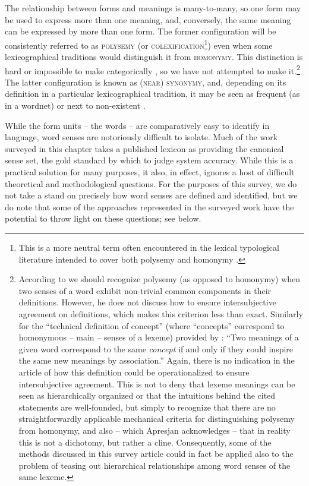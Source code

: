 \documentclass[output=paper]{langsci/langscibook}
\begin{document}
The relationship between forms and meanings is many-to-many, so
one form may be used to express more than one meaning, and, conversely, the same meaning can be expressed by more than one form. The
former configuration will be consistently referred to as
\textsc{polysemy} (or \textsc{colexification}\footnote{This is a more neutral term often encountered in the lexical typological literature intended to cover both polysemy and homonymy \citep[e.g.,][]{francois2008semantic,ostling-2016}.}) even when some lexicographical traditions
would distinguish it from \textsc{homonymy}. This distinction is hard
or impossible to make categorically
\citep{apresjan-1974,murphy-2003,riemer-2010,wishart-2018}, so we have not attempted to make it.\footnote{According to
  \citet{apresjan-1974} we should recognize polysemy (as opposed to
  homonymy) when two senses of a word exhibit non-trivial common
  components in their definitions. However, he does not discuss how to ensure
  intersubjective agreement on definitions, which makes this
  criterion less than exact. Similarly for the ``technical definition
  of concept'' (where ``concepts'' correspond to homonymous -- main --
  senses of a lexeme) provided by \citet[235; emphasis in the
    original]{cooper05}: ``Two meanings of a given word correspond to
  the same \emph{concept} if and only if they could inspire the same
  new meanings by association.'' Again, there is no indication in the
  article of how this definition could be operationalized to ensure
  intersubjective agreement. This is not to deny that lexeme meanings
  can be seen as hierarchically organized or that the intuitions
  behind the cited statements are well-founded, but simply to
  recognize that there are no straightforwardly applicable mechanical
  criteria for distinguishing polysemy from homonymy, and also --
  which Apresjan acknowledges -- that in reality this is not a
  dichotomy, but rather a cline. Consequently, some of the methods
  discussed in this survey article could in fact be applied also to
  the problem of teasing out hierarchical relationships among word
  senses of the same lexeme.}  The latter configuration is known as
\textsc{(near) synonymy}, and, depending on its definition in a
particular lexicographical tradition, it may be seen as frequent (as
in a wordnet) or next to non-existent
\citep{cruse-1986,ci-2008,murphy-2003,riemer-2010}.

While the form units -- the words -- are comparatively easy to
identify in language, word senses are notoriously difficult to
isolate. Much of the work surveyed in this chapter takes a published
lexicon as providing the canonical sense set, the gold standard by
which to judge system accuracy. While this is a practical solution for
many purposes, it also, in effect, ignores a host of difficult
theoretical and methodological questions. For the purposes of this
survey, we do not take a stand on precisely how word senses are
defined and identified, but we do note that some of the approaches
represented in the surveyed work have the potential to throw light on
these questions; see below.
\end{document}
